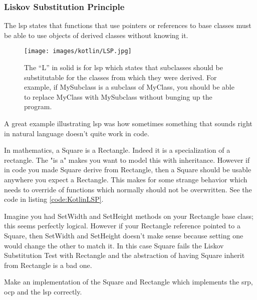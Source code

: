 \subsubsection{Liskov Substitution Principle}


\begin{framed}
	The \gls{lsp} states that functions that use pointers or references to base classes must be able to use objects of derived classes without knowing it.
\end{framed}

\begin{figure}
	\centering
	\texttt{[image: images/kotlin/LSP.jpg]}
	\caption{The “L” in \gls{solid} is for \gls{lsp} which states that subclasses should be substitutable for the classes from which they were derived.
		For example, if MySubclass is a subclass of MyClass, you should be able to replace MyClass with MySubclass without bunging up the program.}
	\label{fir:LSP}
\end{figure}

A great example illustrating \gls{lsp}  was how sometimes something that sounds right in natural language doesn't quite work in code.

In mathematics, a Square is a Rectangle.
Indeed it is a specialization of a rectangle.
The "is a" makes you want to model this with inheritance.
However if in code you made Square derive from Rectangle, then a Square should be usable anywhere you expect a Rectangle.
This makes for some strange behavior which needs to override of functions which normally should not be overwritten.
See the code in listing \ref{code:KotlinLSP}.



Imagine you had SetWidth and SetHeight methods on your Rectangle base class; this seems perfectly logical.
However if your Rectangle reference pointed to a Square, then SetWidth and SetHeight doesn't make sense because setting one would change the other to match it.
In this case Square fails the Liskov Substitution Test with Rectangle and the abstraction of having Square inherit from Rectangle is a bad one.

\begin{exercise}
	Make an implementation of the Square and Rectangle which implements the \gls{srp},  \gls{ocp}  and the \gls{lsp} correctly. 
\end{exercise}

